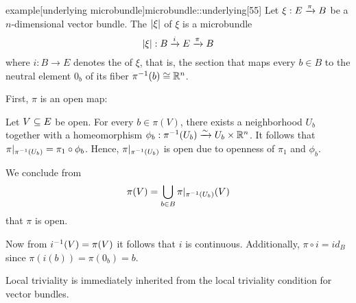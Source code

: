 \begin{mystatement}{example}[underlying microbundle]{microbundle::underlying}[55]
    Let $\xi: E \xto{\pi} B$ be a $n$-dimensional vector bundle.
    The  $\abs{\xi}$ of $\xi$ is a microbundle
    \[ \bundledef{\abs{\xi}}{B}{E}{i}{\pi} \]
    where $i: B \to E$ denotes the  of $\xi$, that is,
    the section that maps every $b \in B$ to the neutral element $0_b$
    of its fiber $\inv{\pi}(b) \cong \R^n$.
\end{mystatement}

\begin{myproof}
    First, $\pi$ is an open map:

    Let $V \sub E$ be open.
    For every $b \in \pi(V)$, there exists a neighborhood $U_b$
    together with a homeomorphism $\phi_b: \inv{\pi}(U_b) \isomto U_b \times \R^n$.
    It follows that $\pi\restr{\inv{\pi}(U_b)} = \pi_1 \circ \phi_b$.
    Hence, $\pi\restr{\inv{\pi}(U_b)}$ is open due to openness of $\pi_1$ and $\phi_b$.

    We conclude from
    \[ \pi(V) = \bigcup_{b \in B} \pi\restr{\inv{\pi}(U_b)}(V) \]
    that $\pi$ is open.

    Now from $\inv{i}(V) = \pi(V)$ it follows that $i$ is continuous.
    Additionally, $\pi \circ i = id_B$ since $\pi(i(b)) = \pi(0_b) = b$. 

    Local triviality is immediately inherited from
    the local triviality condition for vector bundles.
\end{myproof}
